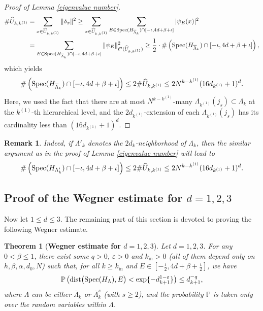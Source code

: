 \documentclass[11pt,reqno,UTF8,twoside]{amsart}
\newcommand{\spec}{{\rm Spec}}
\newcommand{\barLambda}{\overline{\Lambda}}
\renewcommand{\P}{\mathbb{P}}
\newcommand{\dist}{{\rm dist}}
\newtheorem{thm}{Theorem}[section]
\newtheorem{rmk}{\bf Remark}[section]
\theoremstyle{definition}
\numberwithin{equation}{section}
\begin{document}
\begin{proof}[Proof of Lemma \ref{eigenvalue number}]
\begin{align*}
  \# \widehat{U}_{k,k^{(1)}} & = \sum_{x\in \widehat{U}_{k,k^{(1)}}} \|\delta_x \|^2 \geq \sum_{x\in \widehat{U}_{k,k^{(1)}}} \sum_{E\in \spec(H_{\barLambda_k})\cap [-\iota,4d+\beta+\iota]} |\psi_E(x)|^2  \\
      &=\sum_{E\in \spec(H_{\barLambda_k})\cap [-\iota,4d+\beta+\iota]} \|\psi_E\|_{\ell^2(\widehat{U}_{k,k^{(1)}})}^2 \geq \frac{1}{2} \cdot \# \left(  \spec(H_{\barLambda_k})\cap [-\iota,4d+\beta+\iota] \right),
\end{align*}
which yields 
\[\# \left(  \spec(H_{\barLambda_k})\cap [-\iota,4d+\beta+\iota] \right) \leq 2 \# \widehat{U}_{k,k^{(1)}} \leq 2 N^{k-k^{(1)}} (16d_{k^{(1)}}+1)^d. \]
Here, we used the fact that there are at most $N^{k-k^{(1)}}$-many $\Lambda_{k^{(1)}}(j_s)\subset \Lambda_k$ at the $k^{(1)}$-th hierarchical level, and the $2d_{k^{(1)}}$-extension of each $\Lambda_{k^{(1)}}(j_s)$ has its cardinality less than $(16d_{k^{(1)}}+1)^d$.

\end{proof}

\begin{rmk}\label{Lambda' has less eigenvalue number}
  Indeed, if  $\Lambda'_k$ denotes  the $2d_k$-neighborhood of $\Lambda_k$, then the similar argument as in  the proof of Lemma \ref{eigenvalue number} will  lead to 
   \[\# \left(  \spec(H_{\Lambda'_k})\cap [-\iota,4d+\beta+\iota] \right) \leq 2 \# \widehat{U}_{k,k^{(1)}} \leq 2 N^{k-k^{(1)}} (16d_{k^{(1)}}+1)^d. \]
\end{rmk}



\subsection{Proof of the Wegner estimate for $d=1,2,3$}
Now let  $1\leq d\leq 3$. The remaining part of this section is devoted to proving the following Wegner estimate. %
\begin{thm}[{\bf Wegner estimate for $d=1,2,3$}]\label{Wegner estimate for d=1,2,3}
Let $d=1,2, 3$. For any $0<\beta \leq 1$, there exist  some  $q>0$,   $\varepsilon>0$ and    $k_{\text{in}}>0$ (all of them depend only on $h,\beta,\alpha,d_0,N$) such that,  for all $k \geq k_{\text{in}}$ and $E\in [-\frac{\iota}{2},4d+\beta+\frac{\iota}{2}]$, we have 
\begin{equation}\label{Wegner poly probability}
\P\left( \dist\big(\spec(H_{\Lambda}), E\big) < \exp\{-d_{k+1}^{1-\varepsilon}\} \right) \leq d_{k+1}^{-q},
\end{equation}
where $\Lambda$ can be either $\overline{\Lambda}_k$ or $\overline{\Lambda}_k^s$ (with $s\geq 2$), and the probability $\P$ is taken only over the random variables  within $\Lambda$.
\end{thm}
\end{document}
